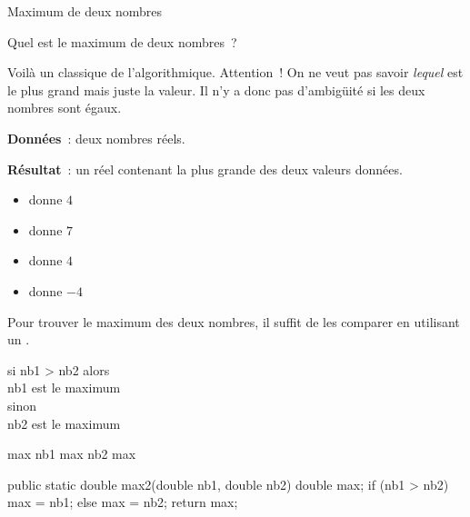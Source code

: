 \begin{Fiche}{Maximum de deux nombres}
\label{fiche:max2nb}

	Quel est le maximum de deux nombres~?


	Voilà un classique de l’algorithmique.  Attention~! On ne veut pas savoir
	\emph{lequel} est le plus grand mais juste la valeur.  Il n’y a donc pas
	d’ambigüité si les deux nombres sont égaux.

	\textbf{Données}~: deux nombres réels.
		
	\textbf{Résultat}~: un réel contenant la plus grande des deux valeurs données.

	\begin{center}	
	\end{center}


	\begin{itemize}
	\item {} donne $4$
	\item {} donne $7$
	\item {} donne $4$
	\item {} donne $-4$
	\end{itemize}
	

	Pour trouver le maximum des deux nombres, il suffit de les comparer en
	utilisant un . 

	\begin{langagenaturel}
		si nb1 > nb2 alors\\
			\tab nb1 est le maximum\\
		sinon\\
			\tab nb2 est le maximum 
	\end{langagenaturel}

	\begin{pseudocode}
			\Let max \Gets nb1
		\Else
			\Let max \Gets nb2
		\EndIf
		\Return max
	\EndAlgo
	\end{pseudocode}

	\begin{java}
public static double max2(double nb1, double nb2){
	double max;
	if (nb1 > nb2){
		max = nb1;
	} else {
		max = nb2;
	}
	return max;
}
	\end{java}


\end{Fiche}
